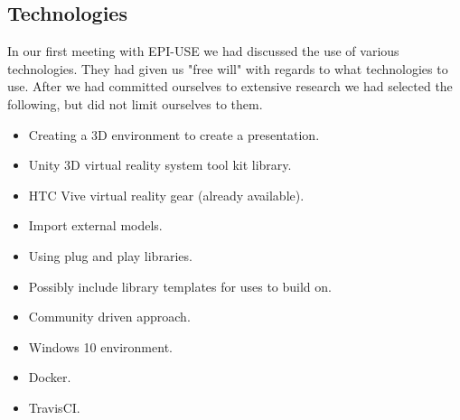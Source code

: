 \subsection{Technologies}
	In our first meeting with EPI-USE we had discussed the use of various technologies. They had given us "free will" with regards to what technologies to use. After we had committed ourselves to extensive research we had selected the following, but did not limit ourselves to them.
	\begin{itemize}		
		\item Creating a 3D environment to create a presentation.		
		\item Unity 3D virtual reality system tool kit library.
		\item HTC Vive virtual reality gear (already available).
		\item Import external models.
		\item Using plug and play libraries.
		\item Possibly include library templates for uses to build on.
		\item Community driven approach.
		\item Windows 10 environment.
		\item Docker.
		\item TravisCI.
	\end{itemize}


